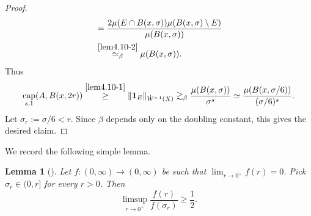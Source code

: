 \documentclass[11pt,leqno]{amsart}
\newtheorem{lemma}[theorem]{Lemma}
\numberwithin{equation}{section}
\theoremstyle{definition}
\DeclareMathOperator{\capp}{cap}
\newcommand{\caps}{\capp_{s,1}}
\begin{document}
\begin{proof}
\begin{align}
			&=\frac{2\mu(E\cap B(x,\sigma))\mu(B(x,\sigma)\setminus E)}{\mu(B(x,\sigma))}\notag\\
			&\overset{\eqref{lem4.10-2}}{\simeq_\beta} \mu(B(x,\sigma)).\label{lem4.8-3}
		\end{align}
		Thus 
		\begin{align*}
			\caps(A,B(x,2r))\overset{\eqref{lem4.10-1}}{\geq} \|{\bf 1}_E\|_{\dot W^{s,1}(X)}\gtrsim_{\beta} \frac{\mu(B(x,\sigma))}{\sigma^s}\simeq \frac{\mu(B(x,\sigma/6))}{(\sigma/6)^s}.
		\end{align*}
		Let $\sigma_r:=\sigma/6<r$. Since $\beta$ depends only on the doubling constant, this gives the desired claim.
	\end{proof}
	
	We record the following simple lemma.   
	\begin{lemma}[{\cite[Lemma 4.7]{La20}}] \label{lem4.11}
		Let $f:(0,\infty)\to (0,\infty)$ be such that $\lim_{r\to 0^+}f(r)=0$.
		Pick $\sigma_r\in (0,r]$ for every $r>0$.
		Then 
		\[
		\limsup_{r\to 0^+}\frac{f(r)}{f(\sigma_r)}\ge \frac{1}{2}.
		\]
	\end{lemma}
	
\end{document}
